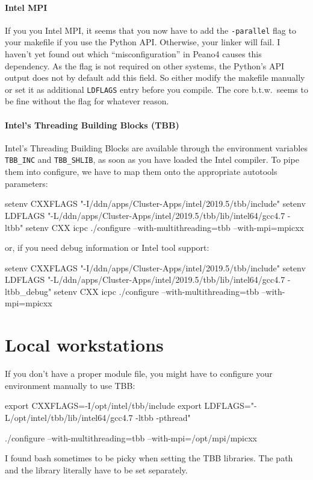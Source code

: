 \paragraph{Intel MPI}

If you you Intel MPI, it seems that you now have to add the \texttt{-parallel}
flag to your makefile if you use the Python API. Otherwise, your linker will
fail.
I haven't yet found out which ``misconfiguration'' in Peano4 causes this
dependency.
As the flag is not required on other systems, the Python's API output does not
by default add this field.
So either modify the makefile manually or set it as additional \texttt{LDFLAGS}
entry before you compile.
The core b.t.w.~seems to be fine without the flag for whatever reason.



\paragraph{Intel's Threading Building Blocks (TBB)}

Intel's Threading Building Blocks are available through the environment
variables \texttt{TBB\_INC} and \texttt{TBB\_SHLIB}, as soon as you have 
loaded the Intel compiler.
To pipe them into configure, we have to map them onto the appropriate autotools
parameters:

 
\begin{code}
 setenv CXXFLAGS "-I/ddn/apps/Cluster-Apps/intel/2019.5/tbb/include"
 setenv LDFLAGS "-L/ddn/apps/Cluster-Apps/intel/2019.5/tbb/lib/intel64/gcc4.7 -ltbb"
 setenv CXX icpc
 ./configure --with-multithreading=tbb --with-mpi=mpicxx
\end{code}

or, if you need debug information or Intel tool support:

\begin{code}
 setenv CXXFLAGS "-I/ddn/apps/Cluster-Apps/intel/2019.5/tbb/include"
 setenv LDFLAGS "-L/ddn/apps/Cluster-Apps/intel/2019.5/tbb/lib/intel64/gcc4.7 -ltbb_debug"
 setenv CXX icpc
 ./configure --with-multithreading=tbb --with-mpi=mpicxx
\end{code}



\section{Local workstations}
If you don't have a proper module file, you might have to configure your environment manually to use TBB:
\begin{code}
export CXXFLAGS=-I/opt/intel/tbb/include
export LDFLAGS="-L/opt/intel/tbb/lib/intel64/gcc4.7 -ltbb -pthread"

./configure --with-multithreading=tbb --with-mpi=/opt/mpi/mpicxx
\end{code}

I found bash sometimes to be picky when setting the TBB libraries. The path and the library literally have to be set separately.






